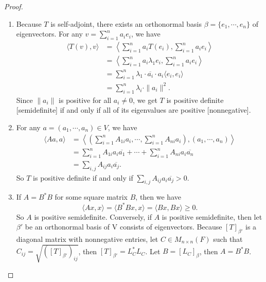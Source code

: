 \documentclass[12pt, a4paper]{article}
\theoremstyle{plain}
\begin{document}
	\begin{proof}
	\hfill
	\begin{enumerate}[label=(\alph*)]
	\item Because $T$ is self-adjoint, there exists an orthonormal basis $\beta = \{e_1,\cdots,e_n\}$ of eigenvectors. For any $v = \sum_{i=1}^{n}{a_ie_i}$, we have 
	\begin{align*}
	\langle{T(v),v}\rangle &= \left\langle{\sum_{i=1}^{n}{a_iT(e_i)},\sum_{i=1}^{n}{a_ie_i}}\right\rangle \\
	&= \left\langle{\sum_{i=1}^{n}{a_i\lambda_1e_i},\sum_{i=1}^{n}{a_ie_i}}\right\rangle \\
	&= \sum_{i=1}^{n}{\lambda_1\cdot \overline{a_i}\cdot a_i\langle{e_i,e_i}\rangle}\\
	&= \sum_{i=1}^{n}{\lambda_i\cdot \|a_i\|^2}.
	\end{align*}
	Since $\|a_i\|$ is positive for all $a_i\neq 0$, we get $T$ is positive definite [semidefinite] if and only if all of its eigenvalues are positive [nonnegative].
	
	\item For any $a = (a_1,\cdots,a_n)\in V$, we have
	\begin{align*}
	\langle{Aa,a}\rangle &= \left\langle{\left(\sum_{i=1}^{n}{A_{1i}a_i},\cdots, \sum_{i=1}^{n}{A_{ni}a_i}\right),(a_1,\cdots,a_n)}\right\rangle\\
	&= \sum_{i=1}^{n}{A_{1i}a_i\overline{a_1}}+\cdots +\sum_{i=1}^{n}{A_{ni}a_i\overline{a_n}}\\
	&= \sum_{i,j}{A_{ij}a_i\overline{a_j}}.
	\end{align*}
	So $T$ is positive definite if and only if $\sum_{i,j}{A_{ij}a_i\overline{a_j}}>0$.
	
	\item If $A=B^*B$ for some square matrix $B$, then we have 
	\[
	\langle{Ax,x}\rangle = \langle{B^*Bx,x}\rangle = \langle{Bx,Bx}\rangle \geq 0.
	\]
	So $A$ is positive semidefinite. Conversely, if $A$ is positive semidefinite, then let $\beta'$ be an orthonormal basis of V consists of eigenvectors. Because $[T]_{\beta'}$ is a diagonal matrix with nonnegative entries, let $C\in M_{n\times n}(F)$ such that $C_{ij} = \sqrt{([T]_{{\beta'}})_{ij}}$, then $[T]_{\beta'} = L_C^* L_C$. Let $B = [L_C]_\beta$, then $A = B^*B$.
	

\end{enumerate}
\end{proof}
\end{document}
